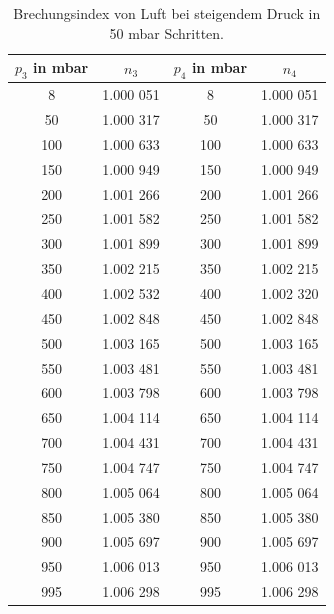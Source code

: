 \begin{table}[H]
    \center
    \caption{Brechungsindex von Luft bei steigendem Druck in 50 mbar Schritten.}
    \label{tab:druckdaten2}
    \begin{tabular}{c|c|c|c}
      $p_3$ in mbar&$n_3$ &$p_4$ in mbar &$n_4$\\
      \hline
      8  & 1.000 051& 8  & 1.000 051\\
      50 & 1.000 317& 50 & 1.000 317\\
      100& 1.000 633& 100& 1.000 633\\
      150& 1.000 949& 150& 1.000 949\\
      200& 1.001 266& 200& 1.001 266\\
      250& 1.001 582& 250& 1.001 582\\
      300& 1.001 899& 300& 1.001 899\\
      350& 1.002 215& 350& 1.002 215\\
      400& 1.002 532& 400& 1.002 320\\
      450& 1.002 848& 450& 1.002 848\\
      500& 1.003 165& 500& 1.003 165\\
      550& 1.003 481& 550& 1.003 481\\
      600& 1.003 798& 600& 1.003 798\\
      650& 1.004 114& 650& 1.004 114\\
      700& 1.004 431& 700& 1.004 431\\
      750& 1.004 747& 750& 1.004 747\\
      800& 1.005 064& 800& 1.005 064\\
      850& 1.005 380& 850& 1.005 380\\
      900& 1.005 697& 900& 1.005 697\\
      950& 1.006 013& 950& 1.006 013\\
      995& 1.006 298& 995& 1.006 298\\
    \end{tabular}
\end{table}


